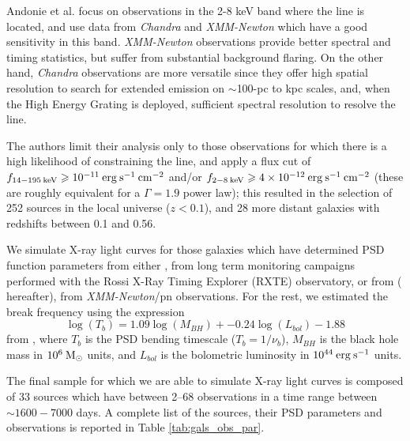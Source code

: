Andonie et al. focus on observations in the 2-8 keV band where the \kalfa{} line is located, and use data from \textit{Chandra} \citep{2000SPIE.4012....2W} and \textit{XMM-Newton} \citep{2001A&A...365L...1J} which have a good sensitivity in this band. \textit{XMM-Newton} observations provide better spectral and timing statistics, but suffer from substantial background flaring.
On the other hand, \textit{Chandra} observations are more versatile since they offer high spatial resolution to search for extended \kalfa{} emission on $\sim$100-pc to kpc scales, and, when the High Energy Grating is deployed, sufficient spectral resolution to resolve the \kalfa{} line.

The authors limit their analysis only to those observations for which there is a high likelihood of constraining the \kalfa{} line, and apply a flux cut of $f_{\rm 14-195\: keV} \geqslant  10^{-11}\: {\rm erg\:s^{-1}\:cm^{-2}}$ and/or $f_{\rm 2-8\: keV} \geqslant  4\times 10^{-12} \: {\rm erg\:s^{-1}\:cm^{-2}}$ (these are roughly equivalent for a $\Gamma{=}1.9$ power law); this resulted in the selection of 252 sources in the local universe ($z<0.1$), and 28 more distant galaxies with redshifts between 0.1 and 0.56.

We simulate X-ray light curves for those galaxies which have determined PSD function parameters from either \citet{summons_thesis}, from long term monitoring campaigns performed with the Rossi X-Ray Timing Explorer (RXTE) observatory, or from \citet{2012A&A...544A..80G} ( hereafter), from \emph{XMM-Newton}/pn observations. For the rest, we estimated the break frequency using the expression
\begin{equation}
    \log(T_b)=1.09\log(M_{BH}) + -0.24\log(L_{bol}) - 1.88
    \label{Eq:T_b}
\end{equation}
from , where $T_b$ is the PSD bending timescale ($T_b = 1/\nu_{b}$), $M_{BH}$ is the black hole mass in $10^6\:\rm M_{\odot}$ units, and  $L_{bol}$ is the bolometric luminosity in $10^{44}\:\rm erg\:s^{-1}$ units.

The final sample for which we are able to simulate X-ray light curves is composed of 33 sources which have between 2--68 observations in a time range between $\sim1600-7000$ days. A complete list of the sources, their PSD parameters and observations is reported in Table \ref{tab:gals_obs_par}.

